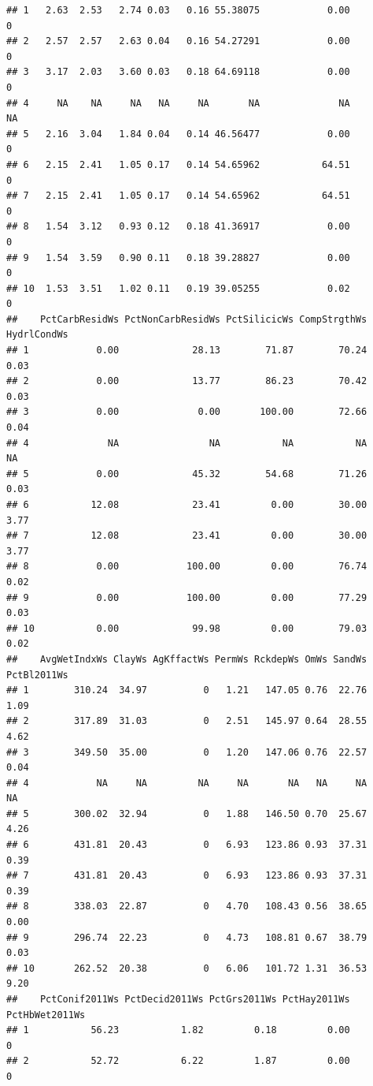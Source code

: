 \documentclass[
]{book}
\begin{document}
\begin{verbatim}
## 1   2.63  2.53   2.74 0.03   0.16 55.38075            0.00            0
## 2   2.57  2.57   2.63 0.04   0.16 54.27291            0.00            0
## 3   3.17  2.03   3.60 0.03   0.18 64.69118            0.00            0
## 4     NA    NA     NA   NA     NA       NA              NA           NA
## 5   2.16  3.04   1.84 0.04   0.14 46.56477            0.00            0
## 6   2.15  2.41   1.05 0.17   0.14 54.65962           64.51            0
## 7   2.15  2.41   1.05 0.17   0.14 54.65962           64.51            0
## 8   1.54  3.12   0.93 0.12   0.18 41.36917            0.00            0
## 9   1.54  3.59   0.90 0.11   0.18 39.28827            0.00            0
## 10  1.53  3.51   1.02 0.11   0.19 39.05255            0.02            0
##    PctCarbResidWs PctNonCarbResidWs PctSilicicWs CompStrgthWs HydrlCondWs
## 1            0.00             28.13        71.87        70.24        0.03
## 2            0.00             13.77        86.23        70.42        0.03
## 3            0.00              0.00       100.00        72.66        0.04
## 4              NA                NA           NA           NA          NA
## 5            0.00             45.32        54.68        71.26        0.03
## 6           12.08             23.41         0.00        30.00        3.77
## 7           12.08             23.41         0.00        30.00        3.77
## 8            0.00            100.00         0.00        76.74        0.02
## 9            0.00            100.00         0.00        77.29        0.03
## 10           0.00             99.98         0.00        79.03        0.02
##    AvgWetIndxWs ClayWs AgKffactWs PermWs RckdepWs OmWs SandWs PctBl2011Ws
## 1        310.24  34.97          0   1.21   147.05 0.76  22.76        1.09
## 2        317.89  31.03          0   2.51   145.97 0.64  28.55        4.62
## 3        349.50  35.00          0   1.20   147.06 0.76  22.57        0.04
## 4            NA     NA         NA     NA       NA   NA     NA          NA
## 5        300.02  32.94          0   1.88   146.50 0.70  25.67        4.26
## 6        431.81  20.43          0   6.93   123.86 0.93  37.31        0.39
## 7        431.81  20.43          0   6.93   123.86 0.93  37.31        0.39
## 8        338.03  22.87          0   4.70   108.43 0.56  38.65        0.00
## 9        296.74  22.23          0   4.73   108.81 0.67  38.79        0.03
## 10       262.52  20.38          0   6.06   101.72 1.31  36.53        9.20
##    PctConif2011Ws PctDecid2011Ws PctGrs2011Ws PctHay2011Ws PctHbWet2011Ws
## 1           56.23           1.82         0.18         0.00              0
## 2           52.72           6.22         1.87         0.00              0

\end{verbatim}
\end{document}
